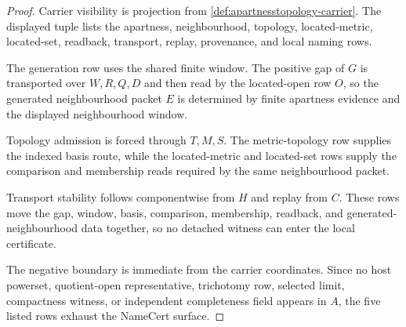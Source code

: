 \begin{proof}
Carrier visibility is projection from \autoref{def:apartnesstopology-carrier}. The displayed tuple lists the apartness, neighbourhood, topology, located-metric, located-set, readback, transport, replay, provenance, and local naming rows.

The generation row uses the shared finite window. The positive gap of $G$ is transported over $W,R,Q,D$ and then read by the located-open row $O$, so the generated neighbourhood packet $E$ is determined by finite apartness evidence and the displayed neighbourhood window.

Topology admission is forced through $T,M,S$. The metric-topology row supplies the indexed basis route, while the located-metric and located-set rows supply the comparison and membership reads required by the same neighbourhood packet.

Transport stability follows componentwise from $H$ and replay from $C$. These rows move the gap, window, basis, comparison, membership, readback, and generated-neighbourhood data together, so no detached witness can enter the local certificate.

The negative boundary is immediate from the carrier coordinates. Since no host powerset, quotient-open representative, trichotomy row, selected limit, compactness witness, or independent completeness field appears in $A$, the five listed rows exhaust the NameCert surface.
\end{proof}


